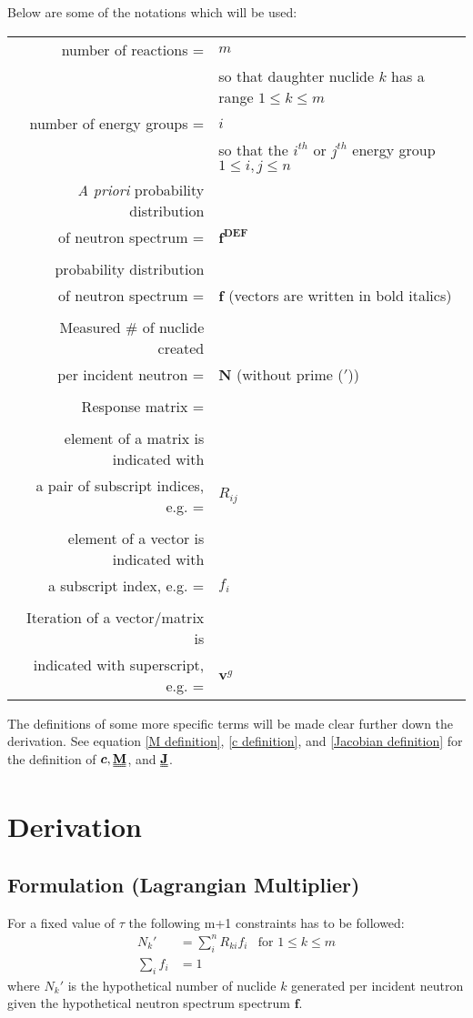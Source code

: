 \documentclass[a4paper, 12pt]{article}
\newcommand{\matr}[1]{\uuline{\bf{#1}}}
\newcommand{\ve}[1]{\boldsymbol{#1}}
\begin{document}
    Below are some of the notations which will be used:
    \begin{table}[H]
    \begin{tabular}{rl}
    number of reactions =& $m$\\
    & so that daughter nuclide $k$ has a range $1\le k\le m$\\
    number of energy groups =& $i$\\
    & so that the $i^{th}$ or $j^{th}$ energy group $1\le i,j\le n$\\
    \emph{A priori} probability distribution \\of neutron spectrum = & $\ve{f^{DEF}}$ \\
    \\
    probability distribution \\of neutron spectrum = & $\ve{f}$ (vectors are written in bold italics)\\
    \\
    Measured \# of nuclide created\\
    per incident neutron =& $\ve{N}$ (without prime ($'$))\\
    \\
    Response matrix =& \matr{R}\\
    \\
    element of a matrix is indicated with \\
    a pair of subscript indices, e.g. =& $R_{ij}$\\
    \\
    element of a vector is indicated with \\
    a subscript index, e.g. =& $f_{i}$\\
    \\
    Iteration of a vector/matrix is\\
    indicated with superscript, e.g. =& $\ve{v}^g$
    \end{tabular}
    \end{table}
    The definitions of some more specific terms will be made clear further down the derivation. See equation \ref{M definition}, \ref{c definition}, and \ref{Jacobian definition} for the definition of $\ve{c}, \matr{M}$, and $\matr{J}$.%

\section{Derivation} \label{Derivation}
\subsection{Formulation (Lagrangian Multiplier)} \label{Lagrangian multipliers}
For a fixed value of $\tau$ the following m+1 constraints has to be followed:
\begin{align}
N_k' &=  \sum_i^n R_{ki} f_i &\text{for }1\le k\le m \\
\sum_i f_i &= 1 \label{Normalization constraint}
\end{align}
where $N_k'$ is the hypothetical number of nuclide $k$ generated per incident neutron given the hypothetical neutron spectrum spectrum $\ve{f}$.
\end{document}
